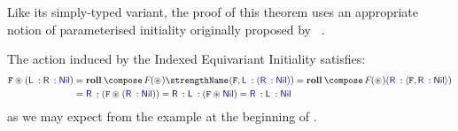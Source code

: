 Like its simply-typed variant, the proof of this theorem uses an
appropriate notion of parameterised initiality originally proposed by
\citeauthor{bird-paterson:generalised-folds-for-nested-datatypes}~\cite{%
  bird-paterson:generalised-folds-for-nested-datatypes}.

\begin{example}
  The action induced by the Indexed Equivariant Initiality
   satisfies:
  \begin{align*}
  \swap\act(\Lft \:: \Rgt \:: \Nil) &=
  \roll\compose\fmap(\act)\strength(\swap, \Lft \:: (\Rgt \:: \Nil)) =
  \roll\compose\fmap(\act)(\Rgt \:: \pair\swap{\Rgt \:: \Nil})
  \\&=
  \Rgt\::(\swap \act (\Rgt \:: \Nil))=
  \Rgt\::\Lft \:: (\swap \act \Nil)=
  \Rgt\::\Lft \:: \Nil
  \end{align*}
  as we may expect from the example at the beginning of .
\end{example}

